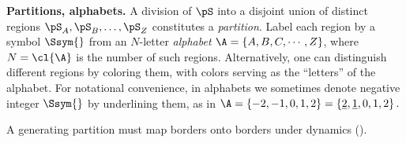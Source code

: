 {\bf Partitions, alphabets.}
A division of {\statesp} $\pS$ into a disjoint union of distinct regions
$\pS_A,\pS_B,\ldots,\pS_Z$ constitutes a {\em
partition}. Label each region by a symbol $\Ssym{}$ from an
$N$-letter  {\em alphabet}
$\A=\{A,B,C,\cdots,Z\}$, where $N=\cl{\A}$ is
the number of such regions. Alternatively, one can distinguish different
regions by coloring them, with colors serving as the ``letters'' of the
alphabet. %
For notational convenience, in alphabets we sometimes denote negative integer
$\Ssym{}$ by underlining them, as in
\(
\A = \{ -{2}, -{1}, 0, 1,2\}
   = \{ \underline{2}, \underline{1}, 0, 1,2\}
\,.
\)

A generating partition must map borders onto borders under dynamics
(\AW).

\begin{description}



\end{description}
